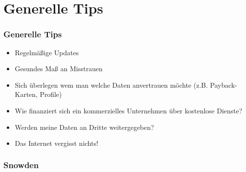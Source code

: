 \section{Generelle Tips}


\begin{frame}
  \frametitle{Generelle Tips}
  \begin{itemize}
   \item Regelmäßige Updates
   \item Gesundes Maß an Misstrauen
   \item Sich überlegen wem man welche Daten anvertrauen möchte (z.B. Payback-Karten, Profile)
   \item Wie finanziert sich ein kommerzielles Unternehmen über kostenlose Dienste?
   \item Werden meine Daten an Dritte weitergegeben?
   \item Das Internet vergisst nichts!
  \end{itemize}
\end{frame}

\begin{frame}
  \frametitle{Snowden}
\end{frame}
